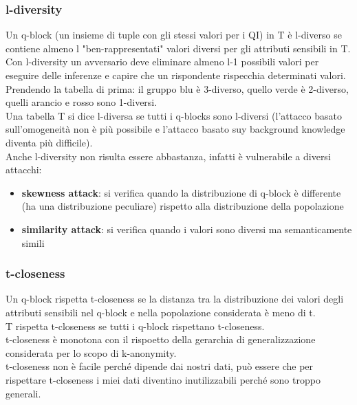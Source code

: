 \subsubsection{l-diversity}
Un q-block (un insieme di tuple con gli stessi valori per i QI) in T è l-diverso se contiene almeno l "ben-rappresentati" valori diversi per gli attributi sensibili in T.
Con l-diversity un avversario deve eliminare almeno l-1 possibili valori per eseguire delle inferenze e capire che un rispondente rispecchia determinati valori.\\
Prendendo la tabella di prima: il gruppo blu è 3-diverso, quello verde è 2-diverso, quelli arancio e rosso sono 1-diversi.\\
Una tabella T si dice l-diversa se tutti i q-blocks sono l-diversi (l'attacco basato sull'omogeneità non è più possibile e l'attacco basato suy background knowledge diventa più difficile).\\
Anche l-diversity non risulta essere abbastanza, infatti è vulnerabile a diversi attacchi:
\begin{itemize}
    \item \textbf{skewness attack}: si verifica quando la distribuzione di q-block è differente (ha una distribuzione peculiare) rispetto alla distribuzione della popolazione
    \item \textbf{similarity attack}: si verifica quando i valori sono diversi ma semanticamente simili
\end{itemize}

\subsubsection{t-closeness}
Un q-block rispetta t-closeness se la distanza tra la distribuzione dei valori degli attributi sensibili nel q-block e nella popolazione considerata è meno di t.\\
T rispetta t-closeness se tutti i q-block rispettano t-closeness.\\
t-closeness è monotona con il rispoetto della gerarchia di generalizzazione considerata per lo scopo di k-anonymity.\\
t-closeness non è facile perché dipende dai nostri dati, può essere che per rispettare t-closeness i miei dati diventino inutilizzabili perché sono troppo generali.
